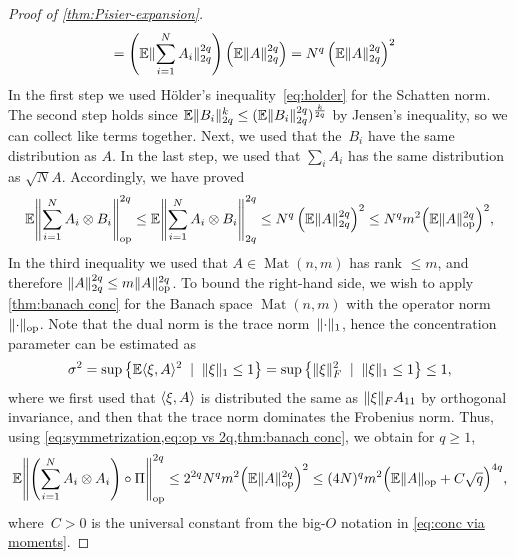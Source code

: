 \documentclass[aos]{imsart}
\theoremstyle{definition}
\numberwithin{equation}{section}
\DeclareMathOperator{\op}{op}
\DeclareMathOperator{\Mat}{Mat}
\DeclarePairedDelimiter{\norm}{\lVert}{\rVert}
\newcommand{\ot}{\otimes}
\newcommand{\E}{\mathbb{E}}
\begin{document}
\begin{appendix}
\begin{proof} [Proof of \cref{thm:Pisier-expansion}]
\begin{align*}
&= \left( \E\norm{\sum_{i=1}^N A_i}_{2q}^{2q} \right) \left( \E \norm{ A }_{2q}^{2q} \right)
= N^q \left( \E\norm{A}_{2q}^{2q} \right)^2
\end{align*}
In the first step we used H\"older's inequality~\eqref{eq:holder} for the Schatten norm.
The second step holds since $\E\norm{B_i}_{2q}^k \leq (\E \norm{B_i}_{2q}^{2q})^{\frac k {2q}}$ by Jensen's inequality, so we can collect like terms together.
Next, we used that the~$B_i$ have the same distribution as $A$.
In the last step, we used that $\sum_i A_i$ has the same distribution as $\sqrt N A$.
Accordingly, we have proved
\begin{align}\label{eq:op vs 2q}
\E \norm*{\sum_{i=1}^N A_i \ot B_i}_{\op}^{2q}
\leq \E \norm*{\sum_{i=1}^N A_i \ot B_i}_{2q}^{2q}
\leq N^q \left( \E\norm{A}_{2q}^{2q} \right)^2
\leq N^q m^2 \Bigl( \E\norm{A}_{\op}^{2q} \Bigr)^2,
\end{align}
In the third inequality we used that $A \in \Mat(n,m)$ has rank $\leq m$, and therefore $\norm{A}_{2q}^{2q} \leq m \norm A_{\op}^{2q}$.
To bound the right-hand side, we wish to apply \cref{thm:banach conc} for the Banach space $\Mat(n,m)$ with the operator norm~$\norm{\cdot}_{\op}$.
Note that the dual norm is the trace norm~$\norm{\cdot}_1$, hence the concentration parameter can be estimated as
\begin{align*}
  \sigma^2
= \sup \left\{ \E \langle \xi, A \rangle^2 \;\mid\; \norm{\xi}_1 \leq 1 \right\}
= \sup \left\{ \norm\xi_F^2 \;\mid\; \norm{\xi}_1 \leq 1 \right\}
\leq 1,
\end{align*}
where we first used that $\braket{\xi,A}$ is distributed the same as $\norm\xi_F A_{11}$ by orthogonal invariance, and then that the trace norm dominates the Frobenius norm.
Thus, using \cref{eq:symmetrization,eq:op vs 2q,thm:banach conc}, we obtain for $q\geq1$,
\begin{align*}
\E \norm*{\left( \sum_{i=1}^N A_i \otimes A_i \right) \circ \Pi}_{\op}^{2q}
\leq 2^{2q} N^q m^2 \Bigl( \E\norm{A}_{\op}^{2q} \Bigr)^2
\leq (4 N)^q m^2 \Bigl( \E\norm A_{\op} + C \sqrt{q} \Bigr)^{4q},
\end{align*}
where~$C>0$ is the universal constant from the big-$O$ notation in \cref{eq:conc via moments}.


\end{proof}
\end{appendix}
\end{document}
